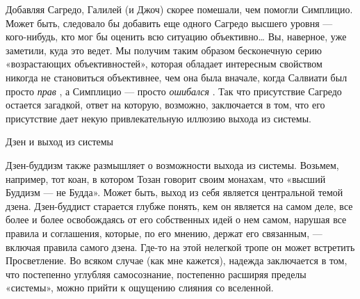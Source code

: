 Добавляя Сагредо, Галилей (и Джоч) скорее помешали, чем помогли Симплицио. Может быть, следовало бы добавить еще одного Сагредо высшего уровня --- кого-нибудь, кто мог бы оценить всю ситуацию объективно\ldots{} Вы, наверное, уже заметили, куда это ведет. Мы получим таким образом бесконечную серию «возрастающих объективностей», которая обладает интересным свойством никогда не становиться объективнее, чем она была вначале, когда Салвиати был просто \emph{прав} , а Симплицио --- просто \emph{ошибался} . Так что присутствие Сагредо остается загадкой, ответ на которую, возможно, заключается в том, что его присутствие дает некую привлекательную иллюзию выхода из системы.

Дзен и выход из системы

Дзен-буддизм также размышляет о возможности выхода из системы. Возьмем, например, тот коан, в котором Тозан говорит своим монахам, что «высший Буддизм --- не Будда». Может быть, выход из себя является центральной темой дзена. Дзен-буддист старается глубже понять, кем он является на самом деле, все более и более освобождаясь от его собственных идей о нем самом, нарушая все правила и соглашения, которые, по его мнению, держат его связанным, --- включая правила самого дзена. Где-то на этой нелегкой тропе он может встретить Просветление. Во всяком случае (как мне кажется), надежда заключается в том, что постепенно углубляя самосознание, постепенно расширяя пределы «системы», можно прийти к ощущению слияния со вселенной.

